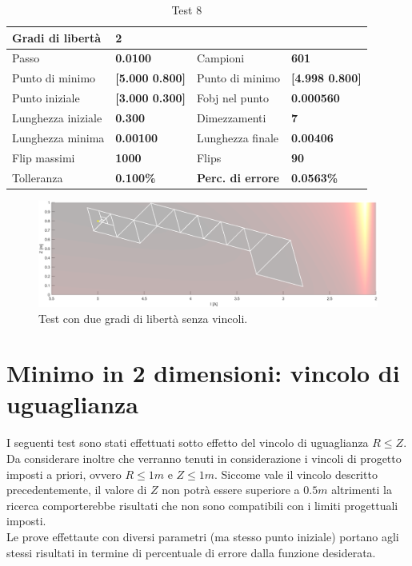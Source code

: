 \documentclass[a4paper, 11pt]{article}
\begin{document}
\begin{table}[h]
	\caption{Test 8}
	\begin{center}
	\begin{tabular}{|l|l|l|l|} 
	\hline 
	Gradi di libertà & \textbf{2} &  &  \\ \hline 
	Passo & \textbf{0.0100} & Campioni & \textbf{601} \\ \hline 
	Punto di minimo & \textbf{{[}5.000 0.800{]}} & Punto di minimo & \textbf{{[}4.998 0.800{]}} \\ \hline 
	Punto iniziale & \textbf{{[}3.000 0.300{]}} & Fobj nel punto & \textbf{0.000560} \\ \hline 
	Lunghezza iniziale & \textbf{0.300} & Dimezzamenti & \textbf{7} \\ \hline 
	Lunghezza minima & \textbf{0.00100} & Lunghezza finale & \textbf{0.00406} \\ \hline
	Flip massimi & \textbf{1000} & Flips & \textbf{90} \\ \hline 
	Tolleranza & \textbf{0.100\%} & \textbf{Perc. di errore} & \textbf{0.0563\%} \\ \hline 
	\end{tabular} 
	\end{center}
	\end{table}

\begin{figure}[H]
	\centering
		\includegraphics[width=15cm]{assets/figure10}
		\caption{Test con due gradi di libertà senza vincoli.}
\end{figure}

\newpage
\section{Minimo in 2 dimensioni: vincolo di uguaglianza}

I seguenti test sono stati effettuati sotto effetto del vincolo di uguaglianza $R
\le Z$. Da considerare inoltre che verranno tenuti in considerazione i vincoli
di progetto imposti a priori, ovvero $R \le 1m$ e $Z \le 1m$. Siccome vale il
vincolo descritto precedentemente, il valore di $Z$ non potrà essere superiore a
$0.5m$ altrimenti la ricerca comporterebbe risultati che non sono compatibili
con i limiti progettuali imposti. \\
Le prove effettaute con diversi parametri (ma stesso punto iniziale) portano
agli stessi risultati in termine di percentuale di errore dalla funzione desiderata.
\end{document}
